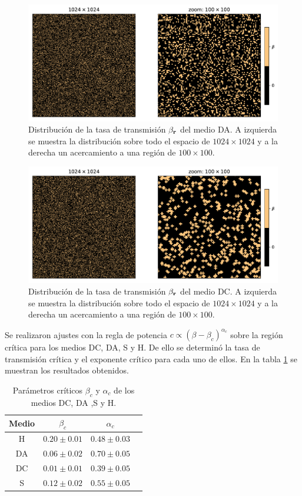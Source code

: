 \begin{figure}[H]
    \centering
    \includegraphics[width=\imsize]{beta_al_zoom.pdf}
    \caption{Distribución de la tasa de transmisión $\beta_{\vb r}$ del medio DA. A izquierda se muestra la distribución sobre 
    todo el espacio de $1024\times1024$ y a la derecha un acercamiento a una región de $100\times100$.}
    \label{beta_al_zoom}
\end{figure}
\begin{figure}[H]
    \centering
    \includegraphics[width=\imsize]{beta_dic_zoom.pdf}
    \caption{Distribución de la tasa de transmisión $\beta_{\vb r}$ del medio DC. A izquierda se muestra la distribución sobre 
    todo el espacio de $1024\times1024$ y a la derecha un acercamiento a una región de $100\times100$.}
    \label{beta_dic_zoom}
\end{figure}

Se realizaron ajustes con la regla de potencia $c\propto(\beta-\beta_c)^{\alpha_c}$ sobre la región crítica para los medios DC, DA, S y H. De ello se determinó la tasa de 
transmisión crítica y el exponente crítico para cada uno de ellos. En la tabla \ref{tab:pc} se muestran los resultados obtenidos.

\begin{table}[h]
    \centering
    \caption{Parámetros críticos $\beta_c$ y $\alpha_c$ de los medios DC, DA ,S y H.}
    \label{tab:pc}
    \begin{tabular}{@{}cccc@{}}
    \toprule
    Medio & $\beta_c$     & $\alpha_c$    \\ \midrule
    H     & $0.20\pm0.01$ & $0.48\pm0.03$ \\
    DA    & $0.06\pm0.02$ & $0.70\pm0.05$ \\
    DC    & $0.01\pm0.01$ & $0.39\pm0.05$ \\
    S     & $0.12\pm0.02$ & $0.55\pm0.05$ \\ \bottomrule
    \end{tabular}
\end{table}


